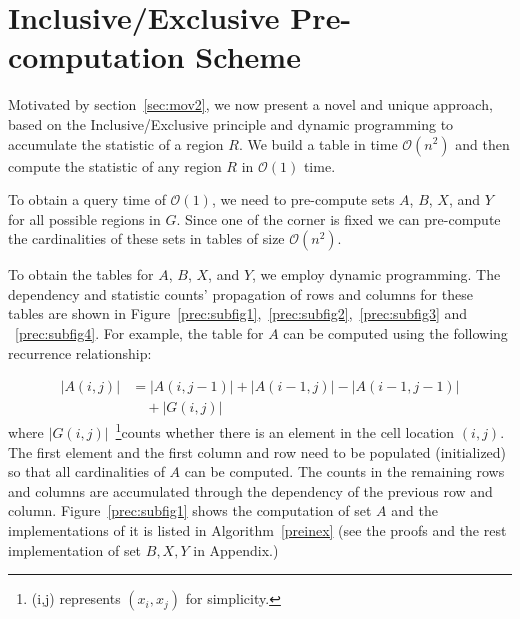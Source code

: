 \documentclass[10pt,journal,cspaper,compsoc]{IEEEtran}
\newcommand\bigo{\mathcal O}
\begin{document}
\section {Inclusive/Exclusive Pre-computation Scheme} \label{DM}

Motivated by section~\ref{sec:mov2}, we now present a novel and unique approach, based on the Inclusive/Exclusive principle and
dynamic programming to accumulate the statistic of a region $R$. We build a table in time $\bigo(n^2)$ and then compute the statistic of any region $R$ in $\bigo(1)$ time.

To obtain a query time of $\bigo(1)$, we need to pre-compute sets $A$, $B$, $X$, and $Y$ for all possible regions in $G$. Since one of the corner is fixed we can pre-compute the cardinalities of these sets in tables of size $\bigo(n^2)$.

To obtain the tables for $A$, $B$, $X$, and $Y$, we employ dynamic programming. The dependency and statistic counts' propagation of rows and columns for these tables are shown in Figure~\ref{prec:subfig1},~\ref{prec:subfig2},~\ref{prec:subfig3} and ~\ref{prec:subfig4}. For example, the table for $A$ can be computed using the following recurrence relationship:

\small
\begin{equation}
\begin{split}
|A(i,j)|  &= |A(i,j-1)| + |A(i-1,j)| - |A(i-1,j-1)| \\& \quad + |G(i,j)|
\end{split}
\end{equation}
\normalsize
where $|G(i,j)|$~\footnote{(i,j) represents $(x_i,x_j)$ for simplicity.}counts whether there is an element in the cell location $(i,j)$. The first element and the first column and row need to be populated (initialized) so that all cardinalities of $A$ can be computed. The counts in the remaining rows and columns are accumulated through the dependency of the previous row and column. Figure~\ref{prec:subfig1} shows the computation of set $A$ and the implementations of it is listed in Algorithm~\ref{preinex} (see the proofs and the rest implementation of set $B,X,Y$ in Appendix.)\\
\end{document}

